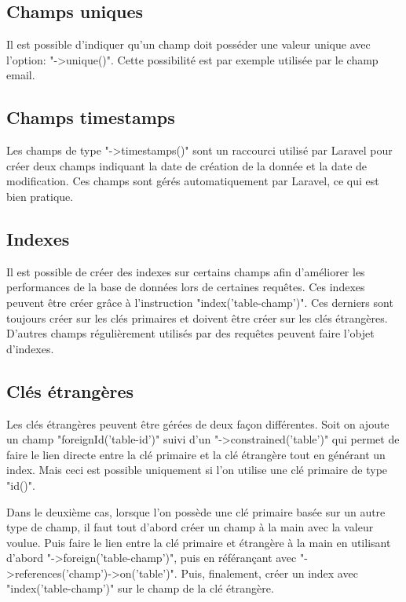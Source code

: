 \documentclass[
    iai, %
    il, %
]{heig-tb}
\begin{document}
\subsection{Champs uniques}
Il est possible d'indiquer qu'un champ doit posséder une valeur unique avec l'option: "->unique()".\newline
Cette possibilité est par exemple utilisée par le champ email.

\subsection{Champs timestamps}
Les champs de type "->timestamps()" sont un raccourci utilisé par Laravel pour créer deux champs indiquant la date de création de la donnée et la date de modification. Ces champs sont gérés automatiquement par Laravel, ce qui est bien pratique.

\subsection{Indexes}
Il est possible de créer des indexes sur certains champs afin d'améliorer les performances de la base de données lors de certaines requêtes. Ces indexes peuvent être créer grâce à l'instruction "index('table-champ')".\newline
Ces derniers sont toujours créer sur les clés primaires et doivent être créer sur les clés étrangères. D'autres champs régulièrement utilisés par des requêtes peuvent faire l'objet d'indexes.

\subsection{Clés étrangères}
Les clés étrangères peuvent être gérées de deux façon différentes.\newline
Soit on ajoute un champ "foreignId('table-id')" suivi d'un "->constrained('table')" qui permet de faire le lien directe entre la clé primaire et la clé étrangère tout en générant un index. Mais ceci est possible uniquement si l'on utilise une clé primaire de type "id()".

Dans le deuxième cas, lorsque l'on possède une clé primaire basée sur un autre type de champ, il faut tout d'abord créer un champ à la main avec la valeur voulue.\newline
Puis faire le lien entre la clé primaire et étrangère à la main en utilisant d'abord "->foreign('table-champ')", puis en référançant avec "->references('champ')->on('table')".\newline
Puis, finalement, créer un index avec "index('table-champ')" sur le champ de la clé étrangère.
\end{document}
